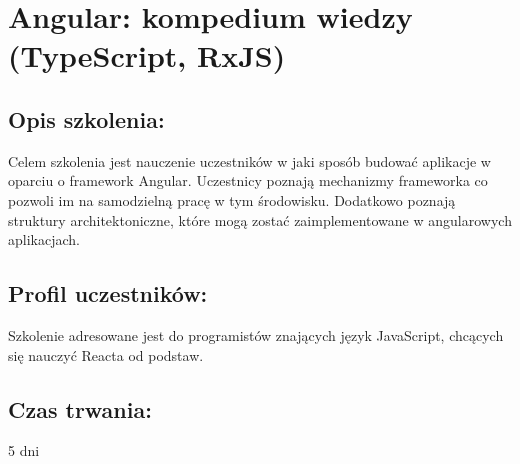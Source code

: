 \documentclass{article}[10pt]
\begin{document}
\newpage


    
	\section{Angular: kompedium wiedzy (TypeScript, RxJS)}

	\subsection*{Opis szkolenia:}
	\begin{adjustwidth}{2cm}{}
\justifying
		
Celem szkolenia jest nauczenie uczestników w jaki sposób budować aplikacje w oparciu o framework Angular. Uczestnicy poznają mechanizmy frameworka co pozwoli im na samodzielną pracę w tym środowisku. Dodatkowo poznają struktury architektoniczne, które mogą zostać zaimplementowane w angularowych aplikacjach. 

	\end{adjustwidth}
	\subsection*{Profil uczestników:}
\begin{adjustwidth}{2cm}{}
\justifying
	
Szkolenie adresowane jest do programistów znających język JavaScript, chcących się nauczyć Reacta od podstaw.
\end{adjustwidth}
	\subsection*{Czas trwania:}
\begin{adjustwidth}{2cm}{}
	5 dni
\end{adjustwidth}
\end{document}

